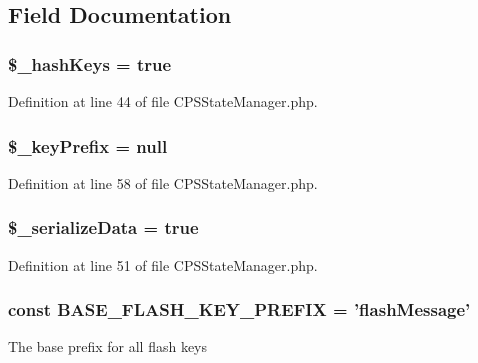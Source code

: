\subsection{Field Documentation}
\hypertarget{classCPSStateManager_ad57dba8c7d1cafb4ca1798f7c981cda8}{
\subsubsection[{\$\_\-hashKeys}]{\setlength{\rightskip}{0pt plus 5cm}\$\_\-hashKeys = true}}
\label{classCPSStateManager_ad57dba8c7d1cafb4ca1798f7c981cda8}


Definition at line 44 of file CPSStateManager.php.

\hypertarget{classCPSStateManager_a1f1b11d239bcb8bdfe83626a972050a6}{
\subsubsection[{\$\_\-keyPrefix}]{\setlength{\rightskip}{0pt plus 5cm}\$\_\-keyPrefix = null}}
\label{classCPSStateManager_a1f1b11d239bcb8bdfe83626a972050a6}


Definition at line 58 of file CPSStateManager.php.

\hypertarget{classCPSStateManager_a4ab3ef1abf22d7966e653c2f981eccbc}{
\subsubsection[{\$\_\-serializeData}]{\setlength{\rightskip}{0pt plus 5cm}\$\_\-serializeData = true}}
\label{classCPSStateManager_a4ab3ef1abf22d7966e653c2f981eccbc}


Definition at line 51 of file CPSStateManager.php.

\hypertarget{classCPSStateManager_a4f2dfe143b9da4d0998257b61eecc8be}{
\subsubsection[{BASE\_\-FLASH\_\-KEY\_\-PREFIX}]{\setlength{\rightskip}{0pt plus 5cm}const {\bf BASE\_\-FLASH\_\-KEY\_\-PREFIX} = 'flashMessage'}}
\label{classCPSStateManager_a4f2dfe143b9da4d0998257b61eecc8be}
The base prefix for all flash keys 

